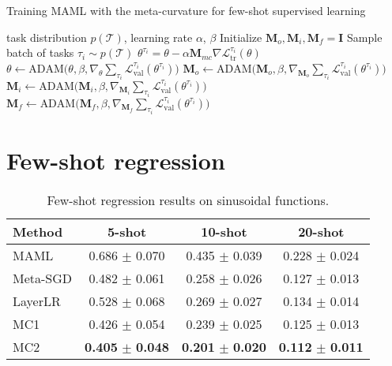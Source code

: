 \documentclass{article}
\begin{document}
\begin{algorithm}
\footnotesize
   \caption{Training MAML with the meta-curvature for few-shot supervised learning}
   \label{alg:meta_curvature_alg}
\begin{algorithmic}
\footnotesize
{} task distribution $p(\mathcal{T})$, learning rate $\alpha$, $\beta$
\STATE Initialize $ \mathbf{M}_o, \mathbf{M}_i, \mathbf{M}_f = \mathbf{I}$
    \STATE Sample batch of tasks $\tau_i \sim p(\mathcal{T})$
        \STATE $\theta^{\tau_i} = \theta - \alpha \mathbf{M}_{mc} \nabla \mathcal{L}_{\textrm{tr}}^{\tau_i}(\theta)$ 
    \ENDFOR
    \STATE $\theta \leftarrow \textrm{ADAM} \big( \theta, \beta, \nabla_\theta \sum_{\tau_i} \mathcal{L}_{\textrm{val}}^{\tau_i}(\theta^{\tau_i}) \big)$
    \STATE $\mathbf{M}_o \leftarrow \textrm{ADAM} \big( \mathbf{M}_o, \beta, \nabla_{\mathbf{M}_o} \sum_{\tau_i} \mathcal{L}_{\textrm{val}}^{\tau_i}(\theta^{\tau_i}) \big)$
    \STATE $\mathbf{M}_i \leftarrow \textrm{ADAM} \big( \mathbf{M}_i, \beta, \nabla_{\mathbf{M}_i} \sum_{\tau_i} \mathcal{L}_{\textrm{val}}^{\tau_i}(\theta^{\tau_i}) \big)$
    \STATE $\mathbf{M}_f \leftarrow \textrm{ADAM} \big( \mathbf{M}_f, \beta, \nabla_{\mathbf{M}_f} \sum_{\tau_i} \mathcal{L}_{\textrm{val}}^{\tau_i}(\theta^{\tau_i}) \big)$
\ENDWHILE
\end{algorithmic}
\end{algorithm}

\section{Few-shot regression}

\begin{table}[t]
\caption{Few-shot regression results on sinusoidal functions.}
\label{table:regression}
\begin{center}
\begin{small}
\begin{tabular}{lccc}
\toprule
Method & 5-shot & 10-shot & 20-shot \\
\midrule
MAML               & 0.686 $\pm$ 0.070 & 0.435 $\pm$ 0.039 & 0.228 $\pm$ 0.024 \\
Meta-SGD           & 0.482 $\pm$ 0.061 & 0.258 $\pm$ 0.026 & 0.127 $\pm$ 0.013 \\
LayerLR            & 0.528 $\pm$ 0.068 & 0.269 $\pm$ 0.027 & 0.134 $\pm$ 0.014 \\
MC1                & 0.426 $\pm$ 0.054 & 0.239 $\pm$ 0.025 & 0.125 $\pm$ 0.013 \\
MC2                & \textbf{0.405} $\pm$ \textbf{0.048} & \textbf{0.201} $\pm$ \textbf{0.020} & \textbf{0.112} $\pm$ \textbf{0.011} \\
\bottomrule
\end{tabular}
\end{small}
\end{center}
\end{table}
\end{document}
